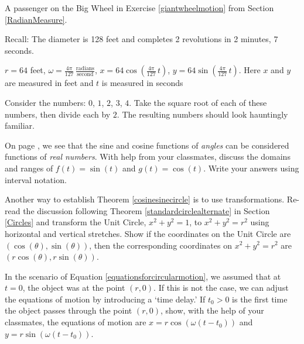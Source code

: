 \documentclass{ximera}
\begin{document}
\begin{question}
\begin{problem}
\begin{solution}
\end{solution}
\end{problem}


\begin{problem}\label{motionlast} 
    A passenger on the Big Wheel in Exercise \ref{giantwheelmotion} from Section \ref{RadianMeasure}.

Recall: The diameter is 128 feet and completes 2 revolutions in 2 minutes, 7 seconds.

\begin{solution}
 $r = 64$ feet, $\omega = \frac{4\pi}{127} \, \frac{\text{radians}}{\text{second}}$,  $x = 64 \cos\left(\frac{4\pi}{127} \, t \right)$, $y = 64 \sin\left(\frac{4\pi}{127} \, t \right)$.  Here $x$ and $y$ are measured in feet and $t$ is measured in seconds


\end{solution}
\end{problem}

\end{question}


\begin{problem}\label{CosineSineFacts}
    Consider the numbers:  $0$, $1$, $2$, $3$, $4$.  Take the square root of each of these numbers, then divide each by $2$. The resulting numbers should look hauntingly familiar. 
\end{problem}

\begin{problem}
    On page \pageref{cosinesineequationsrealnumbers}, we see that the sine and cosine functions of \textit{angles} can be considered functions of \textit{real numbers}.  With help from your classmates, discuss the domains and ranges of  $f(t) = \sin(t)$ and $g(t) = \cos(t)$.  Write your answers using interval notation.
\end{problem}  

\begin{problem}\label{circleofradiusrsinecosinetrans}
      Another way to establish  Theorem \ref{cosinesinecircle} is to use transformations. Re-read the discussion following  Theorem \ref{standardcirclealternate} in Section \ref{Circles}  and transform  the Unit Circle, $x^2+y^2 = 1$, to $x^2 + y^2 = r^2$ using horizontal and vertical stretches.  Show if the coordinates on the Unit Circle are $(\cos(\theta), \sin(\theta))$, then the corresponding coordinates on $x^2+y^2 = r^2$ are $(r \cos(\theta), r \sin(\theta))$.
\end{problem}


\begin{problem}
    In the scenario of Equation \ref{equationsforcircularmotion}, we assumed that at $t=0$, the object was at the point $(r,0)$.  If this is not the case,  we can adjust the equations of motion by introducing a `time delay.'   If $t_{0} > 0$ is the first time the object passes through the point $(r,0)$, show, with the help of your classmates, the equations of motion are $x = r \cos(\omega (t - t_{0}))$ and $y = r \sin(\omega (t-t_{0}))$.
\end{problem}
\end{document}
